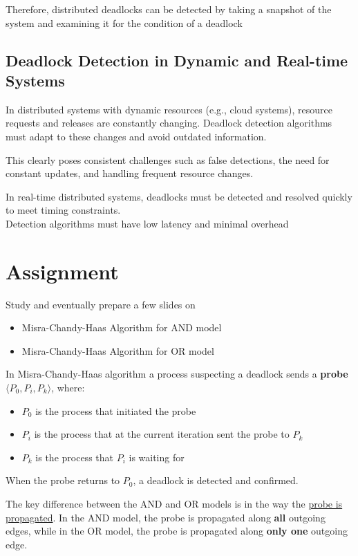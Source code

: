 Therefore, distributed deadlocks can be detected by taking
a snapshot of the system and examining it for the condition
of a deadlock



\subsection{Deadlock Detection in Dynamic and Real-time Systems}

In distributed systems with dynamic resources (e.g., cloud systems), resource requests and releases are constantly changing. Deadlock detection algorithms must adapt to these changes and avoid outdated information.

This clearly poses consistent challenges such as false detections, the need for constant
updates, and handling frequent resource changes.


In real-time distributed systems, deadlocks must be detected and resolved quickly to meet timing constraints.\\
Detection algorithms must have low latency and minimal overhead

\section{Assignment}

Study and eventually prepare a few slides on
\begin{itemize}
   \item Misra-Chandy-Haas Algorithm for AND model
   \item Misra-Chandy-Haas Algorithm for OR model
\end{itemize}

In Misra-Chandy-Haas algorithm a process suspecting a deadlock sends a \textbf{probe} $\langle P_0,P_i,P_k\rangle$, where:
\begin{itemize}
   \item $P_0$ is the process that initiated the probe
   \item $P_i$ is the process that at the current iteration sent the probe to $P_k$
   \item $P_k$ is the process that $P_i$ is waiting for
\end{itemize}
When the probe returns to $P_0$, a deadlock is detected and confirmed.

The key difference between the AND and OR models is in the way the \ul{probe is propagated}. In the AND model, the probe is propagated along \textbf{all} outgoing edges, while in the OR model, the probe is propagated along \textbf{only one} outgoing edge.